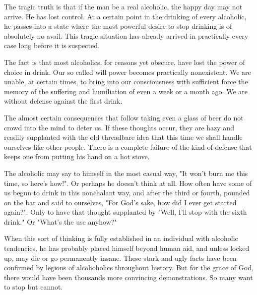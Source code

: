 \begin{biblechapter}

The tragic truth is that if the man be a real alcoholic, the happy day may not arrive. 
He has lost control. 
At a certain point in the drinking of every alcoholic, he passes into a state where the most powerful desire to stop drinking is of absolutely no avail. 
This tragic situation has already arrived in practically every case long before it is suspected.

The fact is that most alcoholics, for reasons yet obscure, have lost the power of choice in drink. 
Our so called will power becomes practically nonexistent. 
We are unable, at certain times, to bring into our consciousness with sufficient force the memory of the suffering and humiliation of even a week or a month ago. 
We are without defense against the first drink.

The almost certain consequences that follow taking even a glass of beer do not crowd into the mind to deter us. 
If these thoughts occur, they are hazy and readily supplanted with the old threadbare idea that this time we shall handle ourselves like other people. 
There is a complete failure of the kind of defense that keeps one from putting his hand on a hot stove.

The alcoholic may say to himself in the most casual way, 
"It won't burn me this time, so here's how!". 
Or perhaps he doesn't think at all. 
How often have some of us begun to drink in this nonchalant way, 
and after the third or fourth, pounded on the bar and said to ourselves, 
"For God's sake, how did I ever get started again?". 
Only to have that thought supplanted by 
"Well, I'll stop with the sixth drink." 
Or "What's the use anyhow?"

When this sort of thinking is fully established in an individual with alcoholic tendencies, he has probably placed himself beyond human aid, 
and unless locked up, may die or go permanently insane. 
These stark and ugly facts have been confirmed by legions of alcohoholics throughout history. 
But for the grace of God, there would have been thousands more convincing demonstrations. 
So many want to stop but cannot.
\end{biblechapter}


